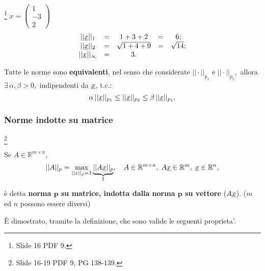 \begin{example}\footnote{Slide 16 PDF 9.}
    $x=\begin{pmatrix}
        1\\
        -3\\
        2
    \end{pmatrix}$
    \begin{equation*}
        \begin{matrix}
            ||\uline x||_1 &=& 1+3+2 &=& 6;\\ 
            ||\uline x||_2 &=& \sqrt{1+4+9} &=& \sqrt{14};\\
            ||\uline x||_\infty &=& 3.
        \end{matrix}
    \end{equation*}
\end{example}

\begin{remark}
    Tutte le norme sono \textbf{equivalenti}, nel senso che considerate $||\cdot||_{p_1}$ e $||\cdot||_{p_2},$ allora $\exists\,\alpha,\beta>0,$ indipendenti da $\uline x$, t.c.:
    \begin{equation*}
        \alpha\,||\uline x||_{p_1}\leq ||\uline x||_{p_2}\leq \beta\,||\uline x||_{p_1}.
    \end{equation*}
\end{remark}

\subsubsection{Norme indotte su matrice}\label{sssec:norme_indotte_matrice}\footnote{Slide 16-19 PDF 9, PG 138-139.}
\begin{definition}
    Se $A\in\mathbb{R}^{m\times n},$
    \begin{equation}\label{eq:normMatr}
        ||A||_p=\underset{||x||_p=1}{\max}\underbrace{||A\uline x||_p}_{\footnotemark},\quad A\in\mathbb{R}^{m\times n},\; A\uline x\in\mathbb{R}^m,\;\uline x\in\mathbb{R}^n,
    \end{equation}
    è detta \textbf{norma $\boldsymbol p$ su matrice, indotta dalla norma $\boldsymbol p$ su vettore} ($A\uline x$). ($m$ ed $n$ possono essere diversi)
\end{definition}

\noindent È dimostrato, tramite la definizione, che sono valide le seguenti proprieta'.

